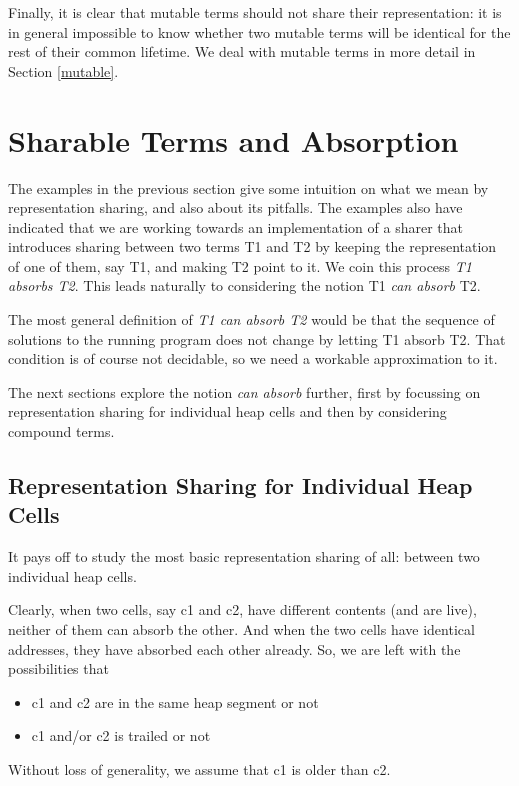 \documentclass{tlp}
\begin{document}
Finally, it is clear that mutable terms should not share their
representation: it is in general impossible to know whether two
mutable terms will be identical for the rest of their common
lifetime. We deal with mutable terms in more detail in Section
\ref{mutable}.



\section{Sharable Terms and Absorption}\label{concepts}

The examples in the previous section give some intuition on what we
mean by representation sharing, and also about its pitfalls. The
examples also have indicated that we are working towards an
implementation of a sharer that introduces sharing between two terms
T1 and T2 by keeping the representation of one of them, say T1, and
making T2 point to it. We coin this process {\em T1 absorbs T2}. This
leads naturally to considering the notion T1 {\em can absorb} T2.

The most general definition of {\em T1 can absorb T2} would be that
the sequence of solutions to the running program does not change by
letting T1 absorb T2. That condition is of course not decidable, so we
need a workable approximation to it.

The next sections explore the notion {\em can absorb} further, first by
focussing on representation sharing for individual heap cells and then
by considering compound terms.


\subsection{Representation Sharing for Individual Heap Cells}\label{individualcell}

It pays off to study the most basic representation sharing of all:
between two individual heap cells.

Clearly, when two cells, say c1 and c2, have different contents (and
are live), neither of them can absorb the other. And when the two
cells have identical addresses, they have absorbed each other
already. So, we are left with the possibilities that
\begin{itemize}
\item c1 and c2 are in the same heap segment or not
\item c1 and/or c2 is trailed or not
\end{itemize}
Without loss of generality, we assume that c1 is older than c2.
\end{document}
